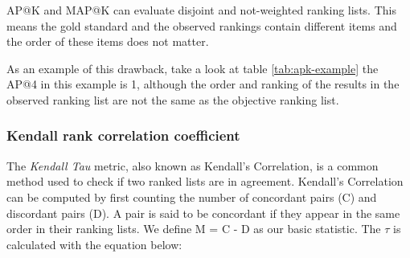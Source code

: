 AP@K and MAP@K can evaluate disjoint and not-weighted ranking lists. This means the gold standard and the observed rankings contain different items and the order of these items does not matter.

As an example of this drawback, take a look at table \ref{tab:apk-example} the AP@4 in this example is 1, although the order and ranking of the results in the observed ranking list are not the same as the objective ranking list.






\subsubsection{Kendall rank correlation coefficient}
The \emph{Kendall Tau} \cite{kendall1938new} metric, also known as Kendall's Correlation, is a common method used to check if two ranked lists are in agreement. Kendall's Correlation can be computed by first counting the number of concordant pairs (C) and discordant pairs (D). A pair is said to be concordant if they appear in the same order in their ranking lists. We define M = C - D as our basic statistic. The $\tau$ is calculated with the equation below: 

